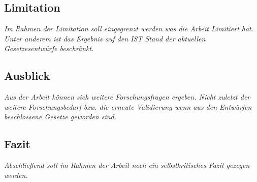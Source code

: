\documentclass[11pt,a4paper,hidelinks]{article}   %
\begin{document}
        \subsection{Limitation}
        \emph{Im Rahmen der Limitation soll eingegrenzt werden was die Arbeit Limitiert hat. Unter anderem ist das Ergebnis auf den IST Stand der aktuellen Gesetzesentwürfe beschränkt.}
        \subsection{Ausblick}
        \emph{Aus der Arbeit können sich weitere Forschungsfragen ergeben. Nicht zuletzt der weitere Forschungsbedarf bzw. die erneute Validierung wenn aus den Entwürfen beschlossene Gesetze geworden sind.}
        \subsection{Fazit}
        \emph{Abschließend soll im Rahmen der Arbeit noch ein selbstkritisches Fazit gezogen werden.}

    \newpage
    \printbibliography
\end{document}
